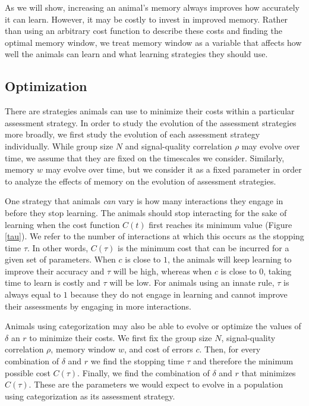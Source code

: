 As we will show, increasing an animal's memory always improves how accurately it can learn. However, it may be costly to invest in improved memory. Rather than using an arbitrary cost function to describe these costs and finding the optimal memory window, we treat memory window as a variable that affects how well the animals can learn and what learning strategies they should use. 

\subsection{Optimization }
There are strategies animals can use to minimize their costs within a particular assessment strategy. In order to study the evolution of the assessment strategies more broadly, we first study the evolution of each assessment strategy individually. While group size $N$ and signal-quality correlation $\rho$ may evolve over time, we assume that they are fixed on the timescales we consider. Similarly, memory $w$ may evolve over time, but we consider it as a fixed parameter in order to analyze the effects of memory on the evolution of assessment strategies. 

One strategy that animals \emph{can} vary is how many interactions they engage in before they stop learning. The animals should stop interacting for the sake of learning when the cost function $C(t)$ first reaches its minimum value (Figure \ref{tau}). We refer to the number of interactions at which this occurs as the stopping time $\tau$. In other words, $C(\tau)$ is the minimum cost that can be incurred for a given set of parameters. When $c$ is close to $1$, the animals will keep learning to improve their accuracy and $\tau$ will be high, whereas when $c$ is close to $0$, taking time to learn is costly and $\tau$ will be low. For animals using an innate rule, $\tau$ is always equal to $1$ because they do not engage in learning and cannot improve their assessments by engaging in more interactions. 

Animals using categorization may also be able to evolve or optimize the values of $\delta$ an $r$ to minimize their costs. We first fix the group size $N$, signal-quality correlation $\rho$, memory window $w$, and cost of errors $c$. Then, for every combination of $\delta$ and $r$ we find the stopping time $\tau$ and therefore the minimum possible cost $C(\tau)$. Finally, we find the combination of $\delta$ and $r$ that minimizes $C(\tau)$. These are the parameters we would expect to evolve in a population using categorization as its assessment strategy. 

